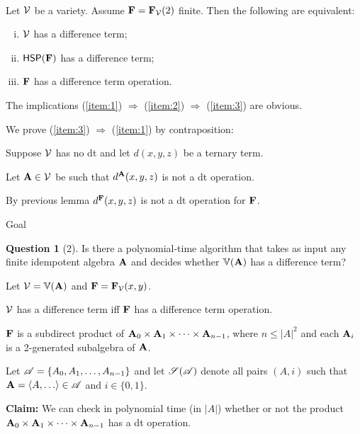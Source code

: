 \documentclass[notes=hide,12pt,xcolor=dvipsnames%
   ]{beamer}
\theoremstyle{definition}
\newtheorem{question}{Question}
\begin{document}
\begin{frame}[label=f2lem,shrink]{~}
  
\begin{corollary}
  \label{thm:F}
  Let $\mathcal{V}$ be a variety. Assume $\mathbf{F} = \mathbf{F}_{\mathcal{V}}(2)$ finite.
  Then the following are equivalent:
  \begin{enumerate}[(i)]
  \item \label{item:1}
    $\mathcal{V}$ has a difference term;
  \item \label{item:2}
    $\mathsf{H} \mathsf{S} \mathsf{P} (\mathbf{F})$ has a difference term;
  \item \label{item:3}
    $\mathbf{F}$ has a difference term operation.
  \end{enumerate}
\end{corollary}

\pause
The implications
  (\ref{item:1}) $\Rightarrow$  (\ref{item:2}) $\Rightarrow$  (\ref{item:3}) are
  obvious. 

  \pause 
  We prove (\ref{item:3}) $\Rightarrow$  (\ref{item:1}) by contraposition:

  Suppose $\mathcal{V}$ has no dt and let $d(x,y,z)$ be a ternary term.

  Let $\mathbf{A}\in \mathcal{V}$ be such that $d^{\mathbf{A}}(x,y,z)$ is not a dt operation. 

  By previous lemma %
  $d^{\mathbf{F}}(x,y,z)$ is not a dt operation for $\mathbf{F}$.
\end{frame}

\begin{frame}[label=goal,shrink]{Goal}
  
  \begin{question}[2]
  Is there a polynomial-time algorithm that takes as input
  any finite idempotent algebra $\mathbf{A}$ and decides whether
  $\operatorname{\mathbb{V}}(\mathbf{A})$ has a difference term?
  \end{question}

  Let $\mathcal{V} = \operatorname{\mathbb{V}}(\mathbf{A})$ and $\mathbf{F} = \mathbf{F}_{\mathcal{V}}(x,y)$.

  $\mathcal{V}$ has a difference term iff
  $\mathbf{F}$ has a difference term operation.
  
  $\mathbf{F}$ is a subdirect product of
  $\mathbf{A}_0 \times \mathbf{A}_1 \times \cdots \times \mathbf{A}_{n-1}$, where $n\leq |A|^2$ and
  each $\mathbf{A}_i$ is a 2-generated subalgebra of $\mathbf{A}$.

  Let $\mathscr{A} = \{A_0, A_1, \dots, A_{n-1}\}$ and let $\mathscr{S}(\mathscr{A})$ denote 
  all pairs $(A, i)$ such that $\bA = \<A, \dots\> \in \scA$ and $i\in \{0,1\}$.

  {\bf Claim:} We can check in polynomial time (in $|A|$)
  whether or not the product
  $\mathbf{A}_0 \times \mathbf{A}_1 \times \cdots \times \mathbf{A}_{n-1}$ has a dt operation.

\end{frame}
\end{document}
